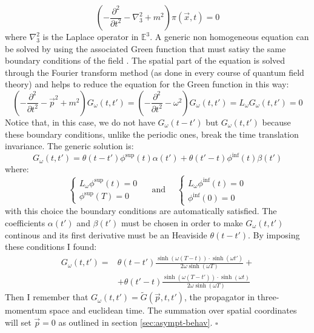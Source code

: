 \documentclass[english, LaM, oneside, noexaminfo]{sapthesis}
\newcommand{\proved}{\newline \hspace*{.97\textwidth} $\square$}
\begin{document}
\begin{equation*}
    \left(-\frac{\partial^2}{\partial t^2} - \nabla_3^2 + m^2 \right) \pi(\vec x,t) = 0
\end{equation*}
where $\nabla_3^2$ is the Laplace operator in $\mathbb{E}^3$.
A generic non homogeneous equation can be solved by using the associated Green function that must satisy the same boundary conditions of the field \cite{zaffaroni-pradisi}.
The spatial part of the equation is solved through the Fourier transform method (as done in every course of quantum field theory) and helps to reduce the equation for the Green function in this way:
\begin{equation*}
    \left(-\frac{\partial^2}{\partial t^2} - \vec p^2 + m^2 \right) G_\omega(t,t') = \left(-\frac{\partial^2}{\partial t^2} - \omega^2 \right) G_\omega(t,t') = L_\omega G_\omega(t,t') = 0
\end{equation*}
Notice that, in this case, we do not have $G_\omega(t-t')$ but $G_\omega(t,t')$ because these boundary conditions, unlike the periodic ones, break the time translation invariance.
The generic solution is:
\begin{equation*}
    G_\omega(t,t') = \theta (t-t')\phi^\text{sup}(t)\alpha (t') + \theta (t'-t) \phi^\text{inf}(t)\beta (t')
\end{equation*}
where:
\begin{equation*}
    \begin{cases}
        L_\omega \phi^\text{sup} (t) = 0 \\
        \phi^\text{sup} (T) = 0
    \end{cases}
    \quad \text{ and } \quad
    \begin{cases}
        L_\omega \phi^\text{inf} (t) = 0 \\
        \phi^\text{inf} (0) = 0
    \end{cases}
\end{equation*}
with this choice the boundary conditions are automatically satisfied.
The coefficients $\alpha (t')$ and $\beta (t')$ must be chosen in order to make $G_\omega(t,t')$ continous and its first derivative must be an Heaviside $\theta(t-t')$.
By imposing these conditions I found:
\begin{equation*}
    \begin{aligned}
        G_\omega (t,t') = & \theta (t-t') \frac{\sinh \left( \omega (T - t) \right) \cdot \sinh \left( \omega t' \right)}{2 \omega \sinh \left( \omega T \right)} + \\
                          & + \theta (t'-t) \frac{\sinh \left( \omega (T - t') \right) \cdot \sinh \left( \omega t \right)}{2 \omega \sinh \left( \omega T \right)}
    \end{aligned}
\end{equation*}
Then I remember that $G_\omega(t,t') = \tilde G(\vec p,t,t')$, the propagator in three-momentum space and euclidean time. The summation over spatial coordinates will set $\vec p=0$ as outlined in section \ref{sec:asympt-behav}.
\proved

\backmatter
{}
\printbibliography

\end{document}
